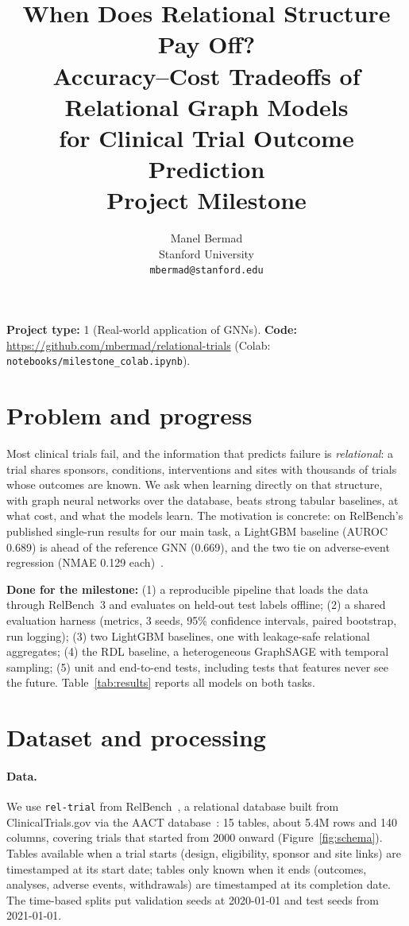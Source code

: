 \documentclass{article}
\title{When Does Relational Structure Pay Off?\\
Accuracy--Cost Tradeoffs of Relational Graph Models\\for Clinical Trial Outcome Prediction\\
\large Project Milestone}
\author{%
  Manel Bermad\\
  Stanford University\\
  \texttt{mbermad@stanford.edu}
}
\date{}
\def\NumTables{15}\def\NumRows{5.4M}\def\NumCols{140}
\begin{document}
\maketitle

\vspace{-1.2em}
\noindent\textbf{Project type:} 1 (Real-world application of GNNs).
\textbf{Code:} \url{https://github.com/mbermad/relational-trials}
(Colab: \texttt{notebooks/milestone\_colab.ipynb}).

\section{Problem and progress}

Most clinical trials fail, and the information that predicts failure is \emph{relational}: a
trial shares sponsors, conditions, interventions and sites with thousands of trials whose
outcomes are known. We ask when learning directly on that structure, with graph neural
networks over the database, beats strong tabular baselines, at what cost, and what the models
learn. The motivation is concrete: on RelBench's published single-run results for our main
task, a LightGBM baseline (AUROC 0.689) is ahead of the reference GNN (0.669), and the two tie
on adverse-event regression (NMAE 0.129 each)~\cite{relbench_leaderboard}.

\textbf{Done for the milestone:} (1) a reproducible pipeline that loads the data through
RelBench~3 and evaluates on held-out test labels offline; (2) a shared evaluation harness
(metrics, 3 seeds, 95\% confidence intervals, paired bootstrap, run logging); (3) two LightGBM
baselines, one with leakage-safe relational aggregates; (4) the RDL baseline, a heterogeneous
GraphSAGE with temporal sampling; (5) unit and end-to-end tests, including tests that features
never see the future. Table~\ref{tab:results} reports all models on both tasks.

\section{Dataset and processing}

\paragraph{Data.} We use \texttt{rel-trial} from RelBench~\cite{robinson2024relbench}, a
relational database built from ClinicalTrials.gov via the AACT database~\cite{aact}:
\NumTables{} tables, about \NumRows{} rows and \NumCols{} columns, covering trials that started
from 2000 onward (Figure~\ref{fig:schema}). Tables available when a trial starts (design,
eligibility, sponsor and site links) are timestamped at its start date; tables only known when
it ends (outcomes, analyses, adverse events, withdrawals) are timestamped at its completion
date. The time-based splits put validation seeds at 2020-01-01 and test seeds from 2021-01-01.
\end{document}
